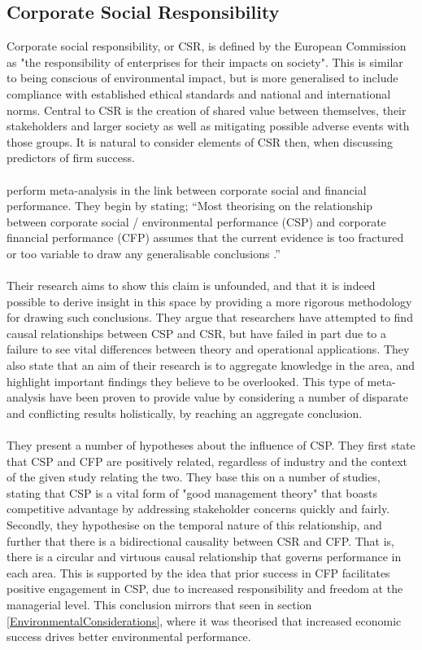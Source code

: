 \subsection{Corporate Social Responsibility} \label{CorporateSocialResponsibility}
{Corporate social responsibility, or CSR, is defined by the European Commission as "the responsibility of enterprises for their impacts on society". This is similar to being conscious of environmental impact, but is more generalised to include compliance with established ethical standards and national and international norms. Central to CSR is the creation of shared value between themselves, their stakeholders and larger society as well as mitigating possible adverse events with those groups. It is natural to consider elements of CSR then, when discussing predictors of firm success. \\\\
\cite{orlitzky2003corporate} perform meta-analysis in the link between corporate social and financial performance. They begin by stating;
``Most theorising on the relationship between corporate social / environmental performance (CSP) and corporate financial performance (CFP) assumes that the current evidence is too fractured or too variable to draw any generalisable conclusions \cite{orlitzky2003corporate}.''\\\\
Their research aims to show this claim is unfounded, and that it is indeed possible to derive insight in this space by providing a more rigorous methodology for drawing such conclusions. They argue that researchers have attempted to find causal relationships between CSP and CSR, but have failed in part due to a failure to see vital differences between theory and operational applications. They also state that an aim of their research is to aggregate knowledge in the area, and highlight important findings they believe to be overlooked. This type of meta-analysis have been proven to provide value by considering a number of disparate and conflicting results holistically, by reaching an aggregate conclusion.\\\\
They present a number of hypotheses about the influence of CSP. They first state that CSP and CFP are positively related, regardless of industry and the context of the given study relating the two. They base this on a number of studies, stating that CSP is a vital form of "good management theory" that boasts competitive advantage by addressing stakeholder concerns quickly and fairly.  Secondly, they hypothesise on the temporal nature of this relationship, and further that there is a bidirectional causality between CSR and CFP. That is, there is a circular and virtuous causal relationship that governs performance in each area. This is supported by the idea that prior success in CFP facilitates positive engagement in CSP, due to increased responsibility and freedom at the managerial level. This conclusion mirrors that seen in section \ref{EnvironmentalConsiderations}, where it was theorised that increased economic success drives better environmental performance.\\\\
}
